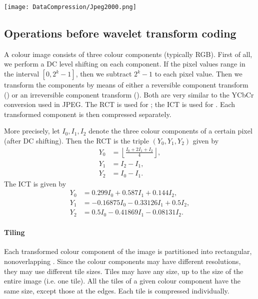 \documentclass[a4paper, 11pt, openany]{book}
\begin{document}
\begin{center}
    \texttt{[image: DataCompression/Jpeg2000.png]}
\end{center}



\subsection{Operations before wavelet transform coding}


A colour image consists of three colour components (typically RGB). First of all, we perform a DC level shifting on each component. If the pixel values range in the interval $[0, 2^k - 1]$, then we subtract $2^k - 1$ to each pixel value. Then we transform the components by means of either a reversible component transform () or an irreversible component transform (). Both are very similar to the YCbCr conversion used in JPEG. The RCT is used for ; the ICT is used for . Each transformed component is then compressed separately.

More precisely, let $I_0, I_1, I_2$ denote the three colour components of a certain pixel (after DC shifting). Then the RCT is the triple $(Y_0, Y_1, Y_2)$ given by
\begin{align*}
    Y_0 &= \left\lfloor \frac{I_0 + 2 I_1 + I_2}{4} \right\rfloor,\\
    Y_1 &= I_2 - I_1,\\
    Y_2 &= I_0 - I_1.
\end{align*}
The ICT is given by
\begin{align*}
    Y_0 &= 0.299 I_0 + 0.587 I_1 + 0.144 I_2,\\
    Y_1 &= -0.16875 I_0 - 0.33126 I_1 + 0.5 I_2,\\
    Y_2 &= 0.5 I_0 - 0.41869 I_1 - 0.08131 I_2.
\end{align*}

\paragraph{Tiling}
Each transformed colour component of the image is partitioned into rectangular, nonoverlapping . Since the colour components may have different resolutions, they may use different tile sizes. Tiles may have any size, up to the size of the entire image (i.e. one tile). All the tiles of a given colour component have the same size, except those at the edges. Each tile is compressed individually.
\end{document}
